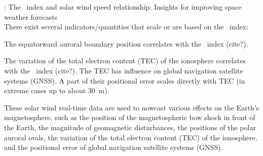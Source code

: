 \citet{Elliott2013}: The \Kp~index and solar wind speed relationship: Insights for improving space weather forecasts\\

There exist several indicators/quantities that scale or are based on the \Kp{}~index:
\begin{itemize*}
	\item The equatorward auroral boundary position correlates with the \Kp~index (cite?).
	\item The variation of the total electron content (TEC) of the ionosphere correlates with the \Kp~index (cite?). The TEC has influence on global navigation satellite systems (GNSS). A part of their positional error scales directly with TEC (in extreme cases up to about \SI{30}{\m}).
\end{itemize*}

These solar wind real-time data are used to nowcast various effects on the Earth's magnetosphere, such as the position of the magnetospheric bow shock in front of the Earth, the magnitude of geomagnetic disturbances, the positions of the polar auroral ovals, the variation of the total electron content (TEC) of the ionosphere, and the positional error of global navigation satellite systems (GNSS).\\


